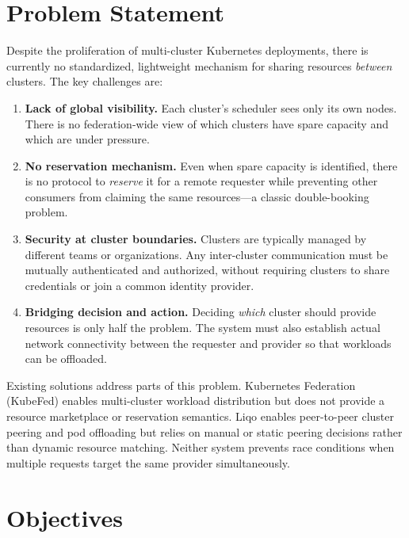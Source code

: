 \section{Problem Statement}
\label{sec:problem-statement}

Despite the proliferation of multi-cluster Kubernetes deployments, there is currently no standardized, lightweight mechanism for sharing resources \emph{between} clusters. The key challenges are:

\begin{enumerate}
    \item \textbf{Lack of global visibility.} Each cluster's scheduler sees only its own nodes. There is no federation-wide view of which clusters have spare capacity and which are under pressure.

    \item \textbf{No reservation mechanism.} Even when spare capacity is identified, there is no protocol to \emph{reserve} it for a remote requester while preventing other consumers from claiming the same resources---a classic double-booking problem.

    \item \textbf{Security at cluster boundaries.} Clusters are typically managed by different teams or organizations. Any inter-cluster communication must be mutually authenticated and authorized, without requiring clusters to share credentials or join a common identity provider.

    \item \textbf{Bridging decision and action.} Deciding \emph{which} cluster should provide resources is only half the problem. The system must also establish actual network connectivity between the requester and provider so that workloads can be offloaded.
\end{enumerate}

Existing solutions address parts of this problem. Kubernetes Federation (KubeFed) enables multi-cluster workload distribution but does not provide a resource marketplace or reservation semantics. Liqo enables peer-to-peer cluster peering and pod offloading but relies on manual or static peering decisions rather than dynamic resource matching. Neither system prevents race conditions when multiple requests target the same provider simultaneously.


\section{Objectives}
\label{sec:objectives}


